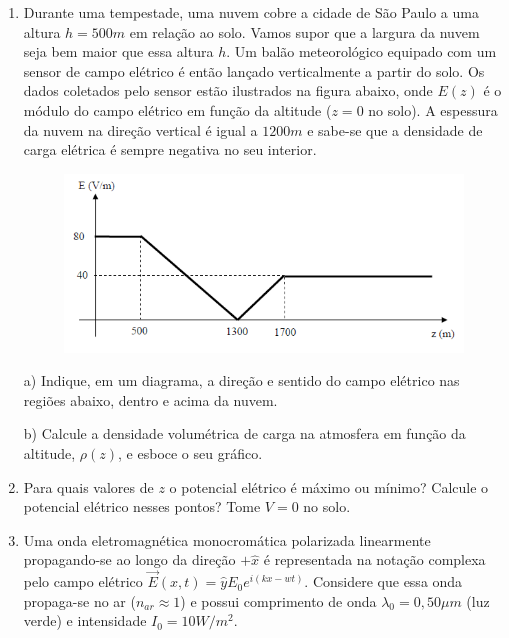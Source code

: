 \begin{enumerate}[start=1,label={\bfseries Q\arabic*.}]
\resposta



\item Durante uma tempestade, uma nuvem cobre a cidade de São Paulo a uma altura $h = 500 m$ em relação ao solo. Vamos supor que a largura da nuvem seja bem maior que essa altura $h$. Um balão meteorológico equipado com um sensor de campo elétrico é então lançado verticalmente a partir do solo. Os dados coletados pelo sensor estão ilustrados na figura abaixo, onde $E(z)$ é o módulo do campo elétrico em função da altitude ($z = 0$ no solo). A espessura da nuvem na direção vertical é igual a $1200 m$ e sabe-se que a densidade de carga elétrica é sempre negativa no seu interior.

\begin{figure}[H]
\centering
\includegraphics[scale=0.7]{eletromag-img/magnetico.png}
\end{figure}

a) Indique, em um diagrama, a direção e sentido do campo elétrico nas regiões abaixo, dentro e acima da nuvem.

\resposta

b) Calcule a densidade volumétrica de carga na atmosfera em função da altitude, $\rho(z)$, e esboce o seu gráfico.

\item[] Para quais valores de $z$ o potencial elétrico é máximo ou mínimo? Calcule o potencial elétrico nesses pontos? Tome $V = 0$ no solo.





\item Uma onda eletromagnética monocromática polarizada linearmente propagando-se ao longo da direção $+ \hat{x}$ é representada na notação complexa pelo campo elétrico $ \vec{E}(x,t) = \hat{y} E_{0} e^{i(kx - wt)} $. Considere que essa onda propaga-se no ar ($n_{ar} \approx 1$) e possui comprimento de onda $\lambda_{0} = 0,50 \mu m$ (luz verde) e intensidade $I_{0} = 10 W/m^{2}$.


\end{enumerate}
